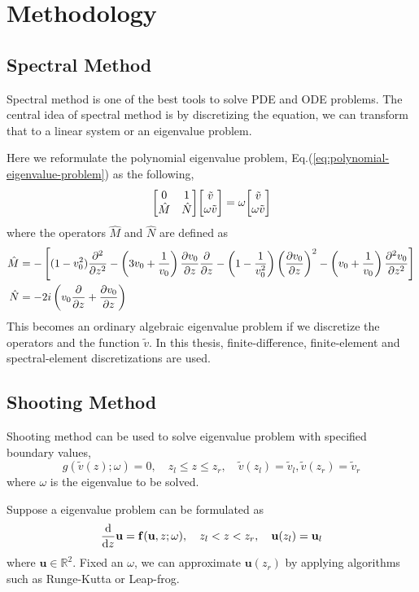 \chapter{Methodology}
\section{Spectral Method}
Spectral method is one of the best tools to solve PDE and ODE problems. \cite{trefethen_spectral_2000} The central idea of spectral method is by discretizing the equation, we can transform that to a linear system or an eigenvalue problem.

Here we reformulate the polynomial eigenvalue problem, Eq.(\ref{eq:polynomial-eigenvalue-problem}) as the following, 
\begin{equation} \label{eq:eigenvalue-problem}
	\mqty[ 0 & 1\\ \hat{M} & \hat{N} ]\mqty[ \tilde{v}\\ \omega \tilde{v}] = \omega\mqty[ \tilde{v}\\ \omega \tilde{v}]
\end{equation}
where the operators $\hat{M}$ and $\hat{N}$ are defined as
\begin{align*}
	\hat{M} &= -\left[(1-v_0^2)\pdv[2]{}{z} 
	-\left(3v_0 + \frac{1}{v_0}\right)\pdv{v_0}{z}\pdv{}{z} 
	- \left(1-\frac{1}{v_0^2}\right)\left(\pdv{v_0}{z}\right)^2 
	- \left(v_0+\frac{1}{v_0}\right)\pdv[2]{v_0}{z}\right] \\
	\hat{N} &= -2i\left(v_0\pdv{}{z} +\pdv{v_0}{z} \right) 
\end{align*}
This becomes an ordinary algebraic eigenvalue problem if we discretize the operators and the function $\tilde{v}$. In this thesis, finite-difference, finite-element and spectral-element discretizations are used.

\section{Shooting Method}
Shooting method can be used to solve eigenvalue problem with specified boundary values,
\begin{equation} \label{eq:boundary-eigenvalue-problem}
g(\tilde{v}(z);\omega) = 0,
\quad
z_l \leq z \leq z_r,
\quad
\tilde{v}(z_l) = \tilde{v}_l, \tilde{v}(z_r) = \tilde{v}_r
\end{equation}
where $\omega$ is the eigenvalue to be solved.

Suppose a eigenvalue problem can be formulated as
\[ \dv{z}\mathbf{u} = \mathbf{f}(\mathbf{u},z;\omega),
\quad
z_l<z<z_r,
\quad
\mathbf{u}(z_l) = \mathbf{u}_l
\]
where $\mathbf{u}\in\mathbb{R}^2$. Fixed an $\omega$, we can approximate $\mathbf{u}(z_r)$ by applying algorithms such as Runge-Kutta or Leap-frog.

